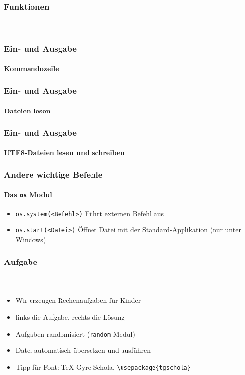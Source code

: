 \documentclass[12pt,ngerman]{beamer}
\newcounter{Aufgabe}
\begin{document}
\begin{frame}[fragile]
\frametitle{Funktionen}
\framesubtitle{~}



\end{frame}


\begin{frame}[fragile]
\frametitle{Ein- und Ausgabe}
\framesubtitle{Kommandozeile}



\end{frame}

\begin{frame}[fragile]
\frametitle{Ein- und Ausgabe}
\framesubtitle{Dateien lesen}

 

\end{frame}


\begin{frame}[fragile]
\frametitle{Ein- und Ausgabe}
\framesubtitle{UTF8-Dateien lesen und schreiben}

 

\end{frame}

\begin{frame}[fragile]
\frametitle{Andere wichtige Befehle}
\framesubtitle{Das \texttt{os} Modul}

\begin{itemize}
\item \lstinline{os.system(<Befehl>)} Führt externen Befehl aus
\item \lstinline{os.start(<Datei>)} Öffnet Datei mit der Standard-Applikation (nur unter Windows)
\end{itemize}
\end{frame}

\begin{frame}[fragile]
\frametitle{Aufgabe \theAufgabe}
\framesubtitle{~}

\begin{itemize}
\item Wir erzeugen Rechenaufgaben für Kinder
\item links die Aufgabe, rechts die Lösung
\item Aufgaben randomisiert (\texttt{random} Modul)
\item Datei automatisch übersetzen und ausführen
\item Tipp für Font: TeX Gyre Schola, \verb|\usepackage{tgschola}|
\end{itemize}
\end{frame}
\end{document}
